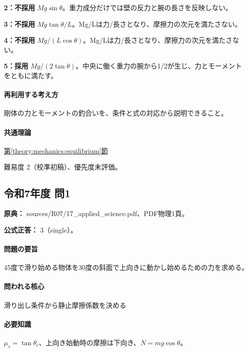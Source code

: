 \noindent\textbf{2：不採用} \(Mg\sin\theta\)。重力成分だけでは壁の反力と腕の長さを反映しない。\par

\noindent\textbf{3：不採用} \(Mg\tan\theta/L\)。Mg/Lは力/長さとなり、摩擦力の次元を満たさない。\par

\noindent\textbf{4：不採用} \(Mg/(L\cos\theta)\)。Mg/Lは力/長さとなり、摩擦力の次元を満たさない。\par

\noindent\textbf{5：採用} \(Mg/(2\tan\theta)\)。中央に働く重力の腕から1/2が生じ、力とモーメントをともに満たす。\par

\paragraph{再利用する考え方} 剛体の力とモーメントの釣合いを、条件と式の対応から説明できること。

\paragraph{共通理論} \hyperref[theory:mechanics:equilibrium]{第\ref*{theory:mechanics:equilibrium}節}

\par 難易度 2（校準初稿）、優先度未評価。

\subsection{令和7年度 問1}
\label{q:r07-reg-applied-01}

\noindent\textbf{原典：} sources/R07/17\_applied\_science.pdf、PDF物理1頁。

\textbf{公式正答：} 3（single）。

\paragraph{問題の要旨} 45度で滑り始める物体を30度の斜面で上向きに動かし始めるための力を求める。

\paragraph{問われる核心} 滑り出し条件から静止摩擦係数を決める

\paragraph{必要知識} \(\mu_s=\tan\theta_c\)、上向き始動時の摩擦は下向き、\(N=mg\cos\theta\)。

